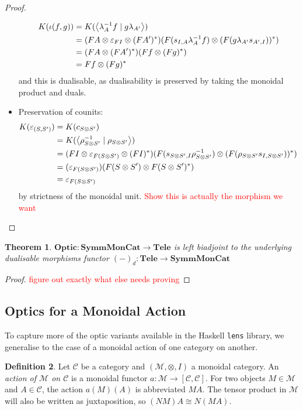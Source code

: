 \documentclass[11pt,a4paper]{article}
\theoremstyle{plain}
\newtheorem{theorem}{Theorem}[subsection]
\theoremstyle{definition}
\newtheorem{definition}[theorem]{Definition}
\newcommand{\C}{\mathscr{C}}
\newcommand{\M}{\mathscr{M}}
\newcommand{\lenslib}{\texttt{lens}}
\newcommand{\SymmMonCat}{\mathbf{SymmMonCat}}
\newcommand{\Tele}{\mathbf{Tele}}
\newcommand{\Optic}{\mathbf{Optic}}
\newcommand{\rep}[2]{{\ensuremath \left\langle #1 \mid #2 \right\rangle}}
\newcommand{\todo}[1]{\textcolor{red}{\small #1}}
\begin{document}
\begin{proof}
\begin{itemize}
\begin{align*}
K(\iota(f, g))
    &= K(\rep{\lambda_A^{-1} f}{g \lambda_{A'}}) \\
    &= (FA \otimes \varepsilon_{FI} \otimes (FA')^*)(F(s_{I,A}\lambda_A^{-1} f) \otimes (F(g \lambda_{A'}s_{A', I}))^* ) \\
    &= (FA \otimes (FA')^*)(Ff \otimes (Fg)^* ) \\
    &= Ff \otimes (Fg)^*
\end{align*}
and this is dualisable, as dualisability is preserved by taking the monoidal product and duals.
\item Preservation of counits: 
\begin{align*}
K(\varepsilon_{(S, S')}) 
&= K(c_{S \otimes S'}) \\
&= K(\rep{\rho_{S \otimes S'}^{-1}}{\rho_{S \otimes S'}}) \\
&= (FI \otimes \varepsilon_{F(S \otimes S')} \otimes (FI)^*)(F(s_{S \otimes S',I}\rho_{S \otimes S'}^{-1}) \otimes (F(\rho_{S \otimes S'} s_{I, S \otimes S'}))^* ) \\
&= (\varepsilon_{F(S \otimes S')})(F(S \otimes S') \otimes F(S \otimes S')^* ) \\
&= \varepsilon_{F(S \otimes S')}
\end{align*}
by strictness of the monoidal unit.
\todo{Show this is actually the morphism we want}
\end{itemize}
\end{proof}

\begin{theorem}
$\Optic : \SymmMonCat \to \Tele$ is left biadjoint to the underlying dualisable morphisms functor ${(-)}_d : \Tele \to \SymmMonCat$
\end{theorem}
\begin{proof}
\todo{figure out exactly what else needs proving}
\end{proof}

\subsection{Optics for a Monoidal Action}

To capture more of the optic variants available in the Haskell \lenslib{} library, we generalise to the case of a monoidal action of one category on another.

\begin{definition}
  Let $\C$ be a category and $(\M, \otimes, I)$ a monoidal category. An \emph{action of $\M$ on $\C$} is a monoidal functor $a : \M \to [\C, \C]$. For two objects $M \in \M$ and $A \in \C$, the action $a(M)(A)$ is abbreviated $MA$. The tensor product in $\M$ will also be written as juxtaposition, so $(NM)A \cong N(MA)$.
\end{definition}
\end{document}
